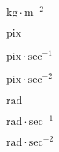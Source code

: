 \documentclass{article}
\begin{document}
$\text{kg}\cdot\text{m}^{-2}$
\pagebreak

$\text{pix}$
\pagebreak

$\text{pix}\cdot\text{sec}^{-1}$
\pagebreak

$\text{pix}\cdot\text{sec}^{-2}$
\pagebreak

$\text{rad}$
\pagebreak

$\text{rad}\cdot\text{sec}^{-1}$
\pagebreak

$\text{rad}\cdot\text{sec}^{-2}$
\pagebreak
\end{document}
